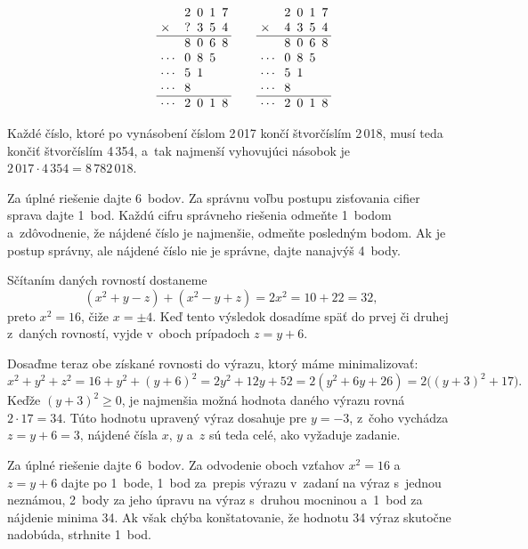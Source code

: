 {$${{}}
\qquad
\vbox{\let\\=\cr
\halign{\strut\ $#$ \hss&&\hbox to1em{\hss$#$\hss}\\
& 2&0&1&7 \\
\times& ?&3&5&4 \\
\hline
& 8&0&6&8 \\
\cdots& 0&8&5&\\
\cdots& 5&1&& \\
\cdots& 8&&& \\
\hline
\cdots&2&0&1&8\\
}}
\qquad
\vbox{\let\\=\cr
\halign{\strut\ $#$ \hss&&\hbox to1em{\hss$#$\hss}\\
& 2&0&1&7 \\
\times& 4&3&5&4 \\
\hline
& 8&0&6&8 \\
\cdots& 0&8&5&\\
\cdots& 5&1&& \\
\cdots& 8&&& \\
\hline
\cdots&2&0&1&8\\
}}
$$

Každé číslo, ktoré po vynásobení číslom 2\,017 končí
štvorčíslím 2\,018, musí teda končiť štvorčíslím 4\,354, a~tak najmenší
vyhovujúci násobok je $2\,017 \cdot 4\,354 = 8\,782\,018$.


\nobreak\medskip\petit\noindent
Za úplné riešenie dajte 6~bodov.
Za správnu voľbu postupu zisťovania cifier sprava dajte 1~bod. Každú
cifru správneho riešenia odmeňte 1~bodom a~zdôvodnenie, že nájdené
číslo je najmenšie, odmeňte posledným bodom. Ak je
postup správny, ale nájdené číslo nie je správne, dajte nanajvýš 4~body.

\endpetit
\bigbreak
}

{%
Sčítaním daných rovností dostaneme
$$
(x^2+y-z)+(x^2-y+z) = 2x^2 = 10+22 = 32,
$$
preto $x^2 = 16$, čiže $x={\pm4}$. Keď tento výsledok dosadíme späť
do prvej či druhej z~daných rovností, vyjde v~oboch prípadoch $z=y+6$.

Dosaďme teraz obe získané rovnosti do výrazu, ktorý máme minimalizovať:
$$
x^2+y^2+z^2 = 16+y^2+(y+6)^2 = 2y^2+12y+52 = 2(y^2+6y+26)
= 2\big((y+3)^2+17 \big).
$$
Keďže $(y+3)^2 \ge 0$, je najmenšia možná hodnota daného výrazu
rovná $2 \cdot 17 = 34$. Túto hodnotu upravený výraz dosahuje pre
$y = {-3}$, z~čoho vychádza $z=y+6=3$, nájdené čísla $x$, $y$ a~$z$
sú teda celé, ako vyžaduje zadanie.

\nobreak\medskip\petit\noindent
Za úplné riešenie dajte 6~bodov.
Za odvodenie oboch vzťahov $x^2 = 16$ a~$z=y+6$ dajte po 1~bode, 1~bod za~prepis
výrazu v~zadaní na výraz s~jednou neznámou,
2~body za jeho úpravu na výraz s~druhou mocninou a~1~bod za nájdenie minima 34.
Ak však chýba konštatovanie, že hodnotu 34 výraz skutočne nadobúda, strhnite 1~bod.
\endpetit
\bigbreak
}

